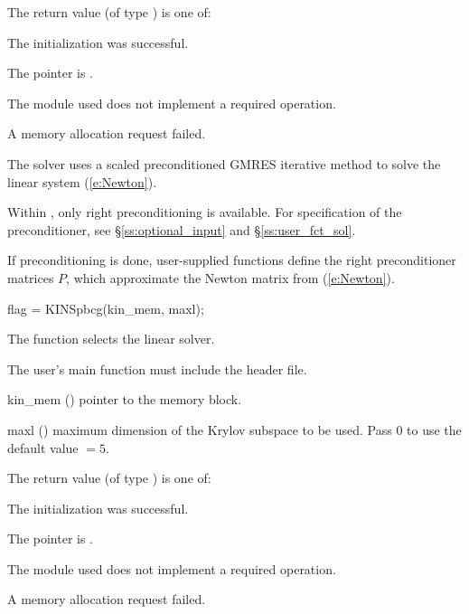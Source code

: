 {
  The return value  (of type ) is one of:
  \begin{args}
  \item[\Id{KINSPILS\_SUCCESS}] 
    The {\kinspgmr} initialization was successful.
  \item[\Id{KINSPILS\_MEM\_NULL}]
    The  pointer is .
  \item[\Id{KINSPILS\_ILL\_INPUT}]
    The {\nvector} module used does not implement a required operation.
  \item[\Id{KINSPILS\_MEM\_FAIL}]
    A memory allocation request failed.
  \end{args}
}
{
  The {\kinspgmr} solver uses a scaled preconditioned GMRES
  iterative method to solve the linear system (\ref{e:Newton}).

  Within {\kinsol}, only right preconditioning is available.
  For specification of the preconditioner,
  see \S\ref{ss:optional_input} and \S\ref{ss:user_fct_sol}.

  If preconditioning is done, user-supplied functions define the right 
  preconditioner matrices $P$, which approximate the Newton matrix
  from (\ref{e:Newton}).
}
{
  flag = KINSpbcg(kin\_mem, maxl);
}
{
  The function  selects the {\kinspbcg} linear solver.

  The user's main function must include the  header file.
}
{
  \begin{args}
  \item[kin\_mem] ()
    pointer to the {\kinsol} memory block.
  \item[maxl] ()
    maximum dimension of the Krylov subspace to be used. Pass $0$ to use the 
    default value $=5$.
  \end{args}
}
{
  The return value  (of type ) is one of:
  \begin{args}
  \item[\Id{KINSPILS\_SUCCESS}] 
    The {\kinspbcg} initialization was successful.
  \item[\Id{KINSPILS\_MEM\_NULL}]
    The  pointer is .
  \item[\Id{KINSPILS\_ILL\_INPUT}]
    The {\nvector} module used does not implement a required operation.
  \item[\Id{KINSPILS\_MEM\_FAIL}]
    A memory allocation request failed.
  \end{args}
}

